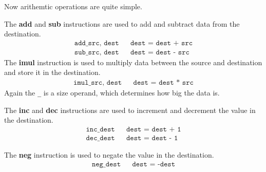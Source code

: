   Now arithemtic operations are quite simple.

  \begin{definition}
    \label{def:add-subtract-multiply}
    The \textbf{add} and \textbf{sub} instructions are used to add and subtract data from the destination. 
    \begin{align*}
      \texttt{add\_ src, dest} && \texttt{dest = dest + src} \\
      \texttt{sub\_ src, dest} && \texttt{dest = dest - src}
    \end{align*}
    The \textbf{imul} instruction is used to multiply data between the source and destination and store it in the destination.  
    \begin{align*}
      \texttt{imul\_ src, dest} && \texttt{dest = dest * src} 
    \end{align*}
    Again the \texttt{\_} is a size operand, which determines how big the data is. 
  \end{definition}

  \begin{definition}
    \label{def:increment-decrement-2}
    The \textbf{inc} and \textbf{dec} instructions are used to increment and decrement the value in the destination. 
    \begin{align*}
      \texttt{inc\_ dest} && \texttt{dest = dest + 1} \\
      \texttt{dec\_ dest} && \texttt{dest = dest - 1}
    \end{align*}
  \end{definition}

  \begin{definition}[Negative]
    \label{def:negative}
    The \textbf{neg} instruction is used to negate the value in the destination. 
    \begin{align*}
      \texttt{neg\_ dest} && \texttt{dest = -dest} 
    \end{align*}
  \end{definition}

